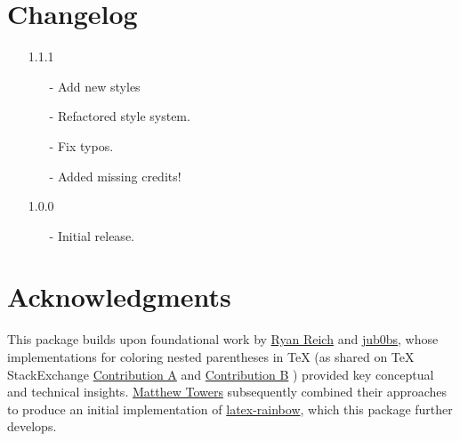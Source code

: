 \documentclass[10pt, a4paper]{article}
\begin{document}
	\section{Changelog}
	\begin{itemize}
		\item[1.1.1] 
		\begin{enumerate}
			\item[-] Add new styles
			\item[-] Refactored style system.
			\item[-] Fix typos.
			\item[-] Added missing credits!
		\end{enumerate}
		\item[1.0.0] 
		\begin{enumerate}
			\item[-] Initial release.
		\end{enumerate}
	\end{itemize}
	\section{Acknowledgments}
	This package builds upon foundational work by \href{https://tex.stackexchange.com/users/575/ryan-reich}{Ryan Reich} and \href{https://tex.stackexchange.com/users/21891/jub0bs}{jub0bs}, whose implementations for coloring nested parentheses in TeX (as shared on TeX StackExchange \href{https://tex.stackexchange.com/questions/88682/indicating-matching-brackets-parentheses-in-tex-output }{Contribution A}  and \href{https://tex.stackexchange.com/questions/235740/how-can-i-color-parentheses-depending-on-the-nesting-level-like-emacs-rainbow}{Contribution B} ) provided key conceptual and technical insights. \href{mailto:matthew.towers@gmail.com}{Matthew Towers} subsequently combined their approaches to produce an initial implementation of \href{https://github.com/matthew-towers/latex-rainbow}{latex-rainbow}, which this package further develops.
\end{document}
